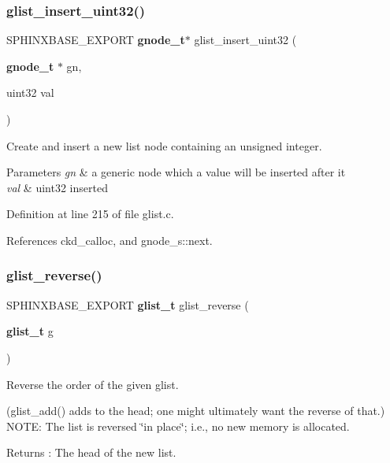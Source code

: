 \subsubsection{glist\+\_\+insert\+\_\+uint32()}
{\footnotesize\ttfamily S\+P\+H\+I\+N\+X\+B\+A\+S\+E\+\_\+\+E\+X\+P\+O\+RT \textbf{ gnode\+\_\+t}$\ast$ glist\+\_\+insert\+\_\+uint32 (\begin{DoxyParamCaption}\item[{\textbf{ gnode\+\_\+t} $\ast$}]{gn,  }\item[{uint32}]{val }\end{DoxyParamCaption})}



Create and insert a new list node containing an unsigned integer. 


\begin{DoxyParams}{Parameters}
{\em gn} & a generic node which a value will be inserted after it \\
\hline
{\em val} & uint32 inserted \\
\hline
\end{DoxyParams}


Definition at line 215 of file glist.\+c.



References ckd\+\_\+calloc, and gnode\+\_\+s\+::next.

\mbox{\label{glist_8h_a399a2a093c6c4ce1012762e4c25c8185}} 
\subsubsection{glist\+\_\+reverse()}
{\footnotesize\ttfamily S\+P\+H\+I\+N\+X\+B\+A\+S\+E\+\_\+\+E\+X\+P\+O\+RT \textbf{ glist\+\_\+t} glist\+\_\+reverse (\begin{DoxyParamCaption}\item[{\textbf{ glist\+\_\+t}}]{g }\end{DoxyParamCaption})}



Reverse the order of the given glist. 

(glist\+\_\+add() adds to the head; one might ultimately want the reverse of that.) N\+O\+TE\+: The list is reversed \char`\"{}in place\char`\"{}; i.\+e., no new memory is allocated. \begin{DoxyReturn}{Returns}
\+: The head of the new list. 
\end{DoxyReturn}

